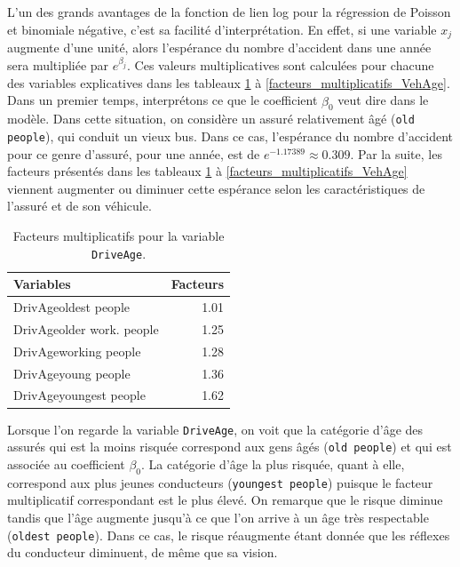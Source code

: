 \documentclass{article}
\begin{document}
	L'un des grands avantages de la fonction de lien log pour la régression de Poisson et binomiale négative, c'est sa facilité d'interprétation. En effet, si une variable $x_j$ augmente d'une unité, alors l'espérance du nombre d'accident dans une année sera multipliée par $e^{\beta_j}$. Ces valeurs multiplicatives sont calculées pour chacune des variables explicatives dans les tableaux \ref{facteurs_multiplicatifs_DriveAge} à \ref{facteurs_multiplicatifs_VehAge}.\\
	
	Dans un premier temps, interprétons ce que le coefficient $\hat{\beta}_0$ veut dire dans le modèle.
	Dans cette situation, on considère un assuré relativement âgé (\texttt{old people}), qui conduit un vieux  bus. Dans ce cas, l'espérance du nombre d'accident pour ce genre d'assuré, pour une année, est de $e^{-1.17389} \approx 0.309$. Par la suite, les facteurs présentés dans les tableaux \ref{facteurs_multiplicatifs_DriveAge} à \ref{facteurs_multiplicatifs_VehAge} viennent augmenter ou diminuer cette espérance selon les caractéristiques de l'assuré et de son véhicule.
	
	\begin{table}[H]
		\centering
		\begin{tabular}{lr}
			\hline
			Variables & Facteurs \\ 
			\hline
			DrivAgeoldest people & 1.01 \\ 
			DrivAgeolder work. people & 1.25 \\ 
			DrivAgeworking people & 1.28 \\ 
			DrivAgeyoung people & 1.36 \\ 
			DrivAgeyoungest people & 1.62 \\ 
			\hline
		\end{tabular}
		\caption{Facteurs multiplicatifs pour la variable \texttt{DriveAge}.}
		\label{facteurs_multiplicatifs_DriveAge}
	\end{table}
	Lorsque l'on regarde la variable \texttt{DriveAge}, on voit que la catégorie d'âge des assurés qui est la moins risquée correspond aux gens âgés (\texttt{old people}) et qui est associée au coefficient $\beta_0$. La catégorie d'âge la plus risquée, quant à elle, correspond aux plus jeunes conducteurs (\texttt{youngest people}) puisque le facteur multiplicatif correspondant est le plus élevé. On remarque que le risque diminue tandis que l'âge augmente jusqu'à ce que l'on arrive à un âge très respectable (\texttt{oldest people}). Dans ce cas, le risque réaugmente étant donnée que les réflexes du conducteur diminuent, de même que sa vision.
\end{document}
